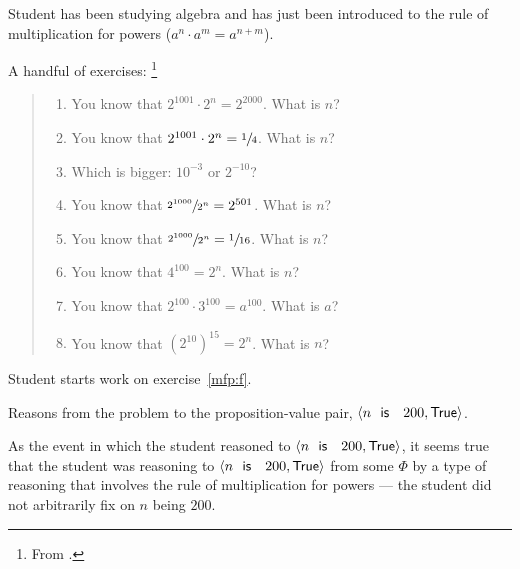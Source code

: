 \begin{note}
  \begin{illustration}
    \label{illu:tR:powers}
    Student has been studying algebra and has just been introduced to the rule of multiplication for powers (\(a^{n} \cdot a^{m} = a^{n + m}\)).

    A handful of exercises:%
    \footnote{
      From \textcite[32]{Gelfand:1993aa}.
    }

    \begin{quote}
      \begin{enumerate}[label=(\alph*), ref=(\alph*)]
      \item
        \label{mfp:a}
        You know that \(2^{1001} \cdot 2^{n} = 2^{2000}\).
        What is \(n\)?
      \item
        \label{mfp:b}
        You know that \(2^{1001} \cdot 2^{n} = \sfrac{1}{4}\).
        What is \(n\)?
      \item
        \label{mfp:c}
        Which is bigger: \(10^{-3}\) or \(2^{-10}\)?
      \item
        \label{mfp:d}
        You know that \(\sfrac{2^{1000}}{2^{n}} = 2^{501}\).
        What is \(n\)?
      \item
        \label{mfp:e}
        You know that \(\sfrac{2^{1000}}{2^{n}} = \sfrac{1}{16}\).
        What is \(n\)?
      \item
        \label{mfp:f}
        You know that \(4^{100} = 2^{n}\).
        What is \(n\)?
      \item
        \label{mfp:g}
        You know that \(2^{100} \cdot 3^{100} = a^{100}\).
        What is \(a\)?
      \item
        \label{mfp:h}
        You know that \((2^{10})^{15} = 2^{n}\).
        What is \(n\)?
      \end{enumerate}
    \end{quote}

    Student starts work on exercise~\ref{mfp:f}.

    Reasons from the problem to the proposition-value pair, \(\pv{n\propI{ is }200}{\valI{True}}\).

    As the event in which the student reasoned to \(\pv{n\propI{ is }200}{\valI{True}}\), it seems true that the student was reasoning to \(\pv{n\propI{ is }200}{\valI{True}}\) from some \pool{} \(\Phi\) by a type of reasoning that involves the rule of multiplication for powers --- the student did not arbitrarily fix on \(n\) being \(200\).


\end{illustration}
\end{note}
